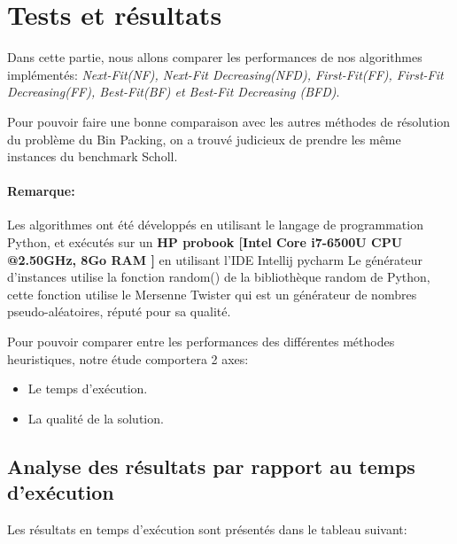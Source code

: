 \documentclass[class=article, crop=false]{standalone}
\begin{document}
\section{Tests et résultats}
Dans cette partie, nous allons comparer les performances de nos algorithmes implémentés:
\emph{Next-Fit(NF), Next-Fit Decreasing(NFD), First-Fit(FF), First-Fit Decreasing(\emph{FF}), Best-Fit(BF) et Best-Fit Decreasing (BFD)}. 

Pour pouvoir faire une bonne comparaison avec les autres méthodes de résolution du problème du Bin Packing,
on a trouvé judicieux de prendre les même instances du benchmark Scholl. \\

\paragraph*{Remarque: } Les algorithmes ont été développés en utilisant le langage de programmation Python, et exécutés sur un \textbf{HP probook [Intel Core i7-6500U CPU @2.50GHz, 8Go RAM ]} en utilisant l'IDE Intellij pycharm
Le générateur d’instances utilise la fonction random() de la bibliothèque random de Python, cette fonction utilise le Mersenne Twister qui est un générateur de nombres pseudo-aléatoires, réputé pour sa qualité.

Pour pouvoir comparer entre les performances des différentes méthodes heuristiques, notre étude comportera 2 axes:
\begin{itemize}
    \item Le temps d’exécution.
    \item La qualité de la solution.
\end{itemize}

\subsection{Analyse des résultats par rapport au temps d’exécution}
Les résultats en temps d'exécution sont présentés dans le tableau suivant:  
\end{document}
